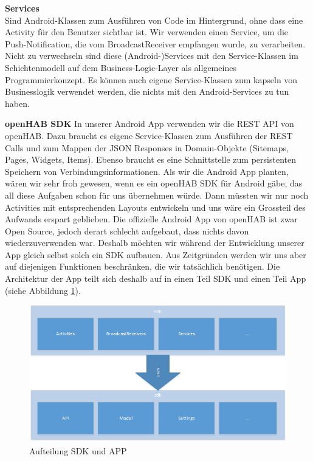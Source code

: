 \textbf{Services}\\
Sind Android-Klassen zum Ausführen von Code im Hintergrund, ohne dass eine Activity für den Benutzer sichtbar ist. Wir verwenden einen Service, um die Push-Notification, die vom BroadcastReceiver empfangen wurde, zu verarbeiten. Nicht zu verwechseln sind diese (Android-)Services mit den Service-Klassen im Schichtenmodell auf dem Business-Logic-Layer als allgemeines Programmierkonzept. Es können auch eigene Service-Klassen zum kapseln von Businesslogik verwendet werden, die nichts mit den Android-Services zu tun haben.

\textbf{openHAB SDK}
In unserer Android App verwenden wir die REST API von openHAB. Dazu braucht es eigene Service-Klassen zum Ausführen der REST Calls und zum Mappen der JSON Responses in Domain-Objekte (Sitemaps, Pages, Widgets, Items). Ebenso braucht es eine Schnittstelle zum persistenten Speichern von Verbindungsinformationen. Als wir die Android App planten, wären wir sehr froh gewesen, wenn es ein openHAB SDK für Android gäbe, das all diese Aufgaben schon für uns übernehmen würde. Dann müssten wir nur noch Activities mit entsprechenden Layouts entwickeln und uns wäre ein Grossteil des Aufwands erspart geblieben. Die offizielle Android App von openHAB ist zwar Open Source, jedoch derart schlecht aufgebaut, dass nichts davon wiederzuverwenden war. Deshalb möchten wir während der Entwicklung unserer App gleich selbst solch ein SDK aufbauen. Aus Zeitgründen werden wir uns aber auf diejenigen Funktionen beschränken, die wir tatsächlich benötigen. Die Architektur der App teilt sich deshalb auf in einen Teil SDK und einen Teil App (siehe Abbildung \ref{fig:androidArchSdk}). 

\begin{figure}[H]
	\centering
		\includegraphics[width=\textwidth]{report/img/android_arch_sdk.png}
	\caption{Aufteilung SDK und APP}
	\label{fig:androidArchSdk}
\end{figure}




